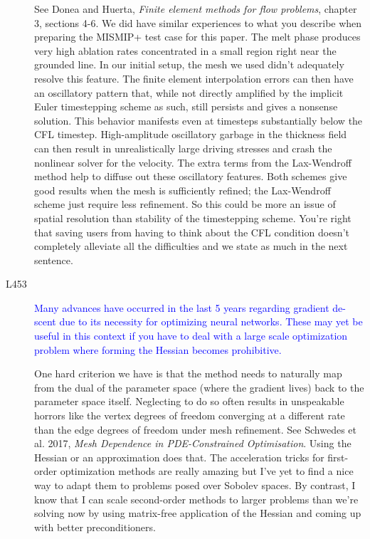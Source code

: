 \documentclass{article}
\theoremstyle{definition}
\theoremstyle{plain}
\begin{document}
\begin{description}
See Donea and Huerta, \emph{Finite element methods for flow problems}, chapter 3, sections 4-6.
We did have similar experiences to what you describe when preparing the MISMIP+ test case for this paper.
The melt phase produces very high ablation rates concentrated in a small region right near the grounded line.
In our initial setup, the mesh we used didn't adequately resolve this feature.
The finite element interpolation errors can then have an oscillatory pattern that, while not directly amplified by the implicit Euler timestepping scheme as such, still persists and gives a nonsense solution.
This behavior manifests even at timesteps substantially below the CFL timestep.
High-amplitude oscillatory garbage in the thickness field can then result in unrealistically large driving stresses and crash the nonlinear solver for the velocity.
The extra terms from the Lax-Wendroff method help to diffuse out these oscillatory features.
Both schemes give good results when the mesh is sufficiently refined; the Lax-Wendroff scheme just require less refinement.
So this could be more an issue of spatial resolution than stability of the timestepping scheme.
You're right that saving users from having to think about the CFL condition doesn't completely alleviate all the difficulties and we state as much in the next sentence.

\item[L453] \textcolor{blue}{Many advances have occurred in the last 5 years regarding gradient de-
scent due to its necessity for optimizing neural networks. These may yet
be useful in this context if you have to deal with a large scale optimization
problem where forming the Hessian becomes prohibitive.}

One hard criterion we have is that the method needs to naturally map from the dual of the parameter space (where the gradient lives) back to the parameter space itself.
Neglecting to do so often results in unspeakable horrors like the vertex degrees of freedom converging at a different rate than the edge degrees of freedom under mesh refinement.
See Schwedes et al. 2017, \emph{Mesh Dependence in PDE-Constrained Optimisation}.
Using the Hessian or an approximation does that.
The acceleration tricks for first-order optimization methods are really amazing but I've yet to find a nice way to adapt them to problems posed over Sobolev spaces.
By contrast, I know that I can scale second-order methods to larger problems than we're solving now by using matrix-free application of the Hessian and coming up with better preconditioners.


\end{description}
\end{document}
